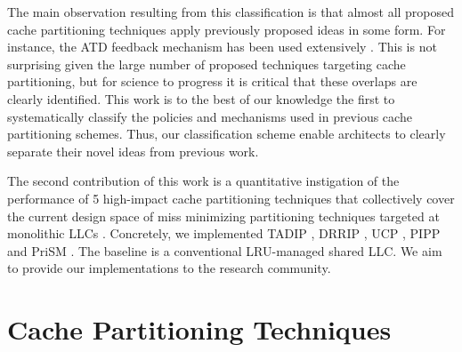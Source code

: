 The main observation resulting from this classification is that almost all proposed cache partitioning techniques apply previously proposed ideas in some form.
For instance, the ATD feedback mechanism has been used extensively .
This is not surprising given the large number of proposed techniques targeting cache partitioning, but for science to progress it is critical that these overlaps are clearly identified.
This work is to the best of our knowledge the first to systematically classify the policies and mechanisms used in previous cache partitioning schemes.
Thus, our classification scheme enable architects to clearly separate their novel ideas from previous work.

The second contribution of this work is a quantitative instigation of the performance of 5 high-impact cache partitioning techniques that collectively cover the current design space of miss minimizing partitioning techniques targeted at monolithic LLCs .
Concretely, we implemented TADIP \cite{jaleel08}, DRRIP \cite{jaleel10}, UCP \cite{utilityBasedCachePartitioning}, PIPP \cite{xie09} and PriSM \cite{manikantan12}.
The baseline is a conventional LRU-managed shared LLC.
We aim to provide our implementations to the research community.



\section{Cache Partitioning Techniques}

